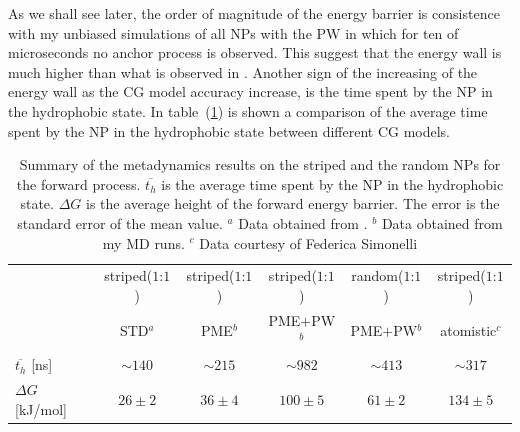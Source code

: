 As we shall see later, the order of magnitude of the energy barrier is consistence with my unbiased simulations of all \acp{NP} with the \ac{PW} in which for ten of microseconds no anchor process is observed. This suggest that the energy wall is much higher than what is observed in \cite{ourPaper}. Another sign of the increasing of the energy wall as the \ac{CG} model accuracy increase, is the time spent by the \ac{NP} in the hydrophobic state. In table~(\ref{tab:hydroTime}) is shown a comparison of the average time spent by the \ac{NP} in the hydrophobic state between different \ac{CG} models.
\begin{table}[h!t]
	\centering\footnotesize
	\begin{tabular}{lccccc}
		\toprule
		\,	& striped($1$:$1$)	& striped($1$:$1$)	& striped($1$:$1$)	& random($1$:$1$)	& striped($1$:$1$) 	\\
		\,	& STD$^a$	& \acs{PME}$^b$	& \acs{PME}$+$\acs{PW}$^b$	& \acs{PME}$+$\acs{PW}$^b$ 	& atomistic$^c$		\\ \toprule
	$\overline{t_{h}}$ [ns]	& $\sim 140$& $\sim 215$	& $\sim 982$	& $\sim 413$ 	& $\sim 317$		\\ \midrule
	$\Delta G$ [kJ/mol] 	& $26 \pm 2$& $36 \pm 4$	& $100 \pm 5$	& $61 \pm 2$ 	& $134 \pm 5$		\\ \bottomrule
	\end{tabular}
	\caption{Summary of the metadynamics results on the striped and the random \acp{NP} for the forward process. $\overline{t_h}$ is the average time spent by the \acs{NP} in the hydrophobic state. $\Delta G$ is the average height of the forward energy barrier. The error is the standard error of the mean value. $^a$ Data obtained from \cite{ourPaper}. $^b$ Data obtained from my \acs{MD} runs. $^c$ Data courtesy of Federica Simonelli}%
	\label{tab:hydroTime}
\end{table}

